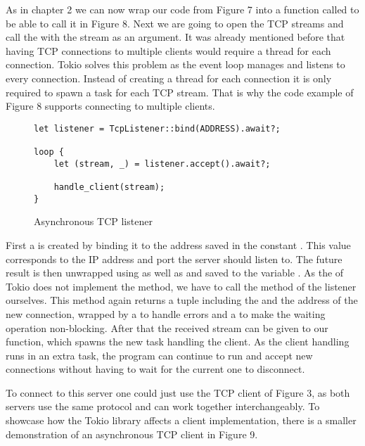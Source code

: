 As in chapter 2 we can now wrap our code from Figure 7 into a function called  to be able to call
it in Figure 8. Next we are going to open the TCP streams and call the  with the stream as an
argument. It was already mentioned before that having TCP connections to multiple clients would require a thread for
each connection. Tokio solves this problem as the event loop manages and listens to every connection. Instead of
creating a thread for each connection it is only required to spawn a task for each TCP stream. That is why the code
example of Figure 8 supports connecting to multiple clients.

\begin{figure}[ht]
    \begin{verbatim}
let listener = TcpListener::bind(ADDRESS).await?;

loop {
    let (stream, _) = listener.accept().await?;

    handle_client(stream);
}
    \end{verbatim}
    \caption{Asynchronous TCP listener}
\end{figure}

First a  is created by binding it to the address saved in the  constant
. This value corresponds to the IP address and port the server should listen to. The future result is
then unwrapped using  as well as  and saved to the variable . As the
 of Tokio does not implement the  method, we have to call the  method of
the listener ourselves. This method again returns a tuple including the  and the address of the new
connection, wrapped by a  to handle errors and a  to make the waiting operation non-blocking.
After that the received stream can be given to our  function, which spawns the new task handling
the client. As the client handling runs in an extra task, the program can continue to run and accept new connections
without having to wait for the current one to disconnect.

To connect to this server one could just use the TCP client of Figure 3, as both servers use the same protocol and can
work together interchangeably. To showcase how the Tokio library affects a client implementation, there is a smaller
demonstration of an asynchronous TCP client in Figure 9.

